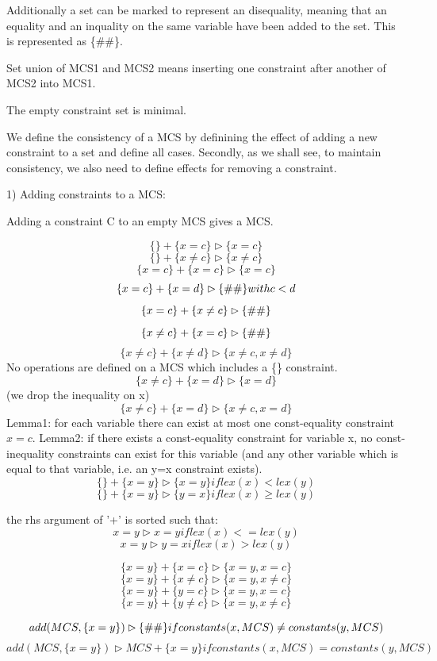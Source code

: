 Additionally a set can be marked to represent an disequality, meaning that an equality and an inquality on the same variable have been added to the set. This is represented as \{\#\#\}.

Set union of MCS1 and MCS2 means inserting one constraint after another of MCS2 into MCS1.

The empty constraint set is minimal.

We define the consistency of a MCS by definining the effect of adding a new constraint to a set and define all cases.
Secondly, as we shall see, to maintain consistency, we also need to define effects for removing a constraint.


1) Adding constraints to a MCS:

Adding a constraint C to an empty MCS gives a MCS.

\[\{\}+\{x=c\}\rhd \{x=c\}\]
\[\{\}+\{x\neq c\}\rhd \{x\neq c\}\]
\[\{x=c\}+\{x=c\}\rhd \{x=c\}\]
\[\{x=c\}+\{x=d\}\rhd \{\#\#\} with c<d\]
\[\{x=c\}+\{x\neq c\}\rhd \{\#\#\}\]
\[\{x\neq c\}+\{x=c\}\rhd \{\#\#\}\]
\[\{x\neq c\}+\{x\neq d\}\rhd \{x\neq c,x\neq d\}\]
No operations are defined on a MCS which includes a \{\deqop\} constraint.
\[\{x\neq c\}+\{x=d\}\rhd \{x=d\}\] (we drop the inequality on x)
\[\{x\neq c\}+\{x=d\}\rhd \{x\neq c,x=d\}\]
Lemma1: for each variable there can exist at most one const-equality constraint $x=c$.
Lemma2: if there exists a const-equality constraint for variable x, no const-inequality constraints can exist for this variable (and any other variable which is equal to that variable, i.e. an y=x constraint exists).
\[\{\}+\{x=y\}\rhd \{x=y\} if lex(x)<lex(y)\]
\[\{\}+\{x=y\}\rhd \{y=x\} if lex(x)\geq lex(y)\]

the rhs argument of '+' is sorted such that:
\[x=y \rhd  x=y if lex(x)<=lex(y)\]
\[x=y \rhd  y=x if lex(x)>lex(y)\]

\[\{x=y\}+\{x=c\}\rhd \{x=y,x=c\}\]
\[\{x=y\}+\{x\neq c\}\rhd \{x=y,x\neq c\}\]
\[\{x=y\}+\{y=c\}\rhd \{x=y,x=c\}\]
\[\{x=y\}+\{y\neq c\}\rhd \{x=y,x\neq c\}\]

\[add(MCS,\{x=y\})\rhd \{\#\#\} if constants(x,MCS)\neq constants(y,MCS)\]
\[add(MCS,\{x=y\})\rhd MCS+\{x=y\} if constants(x,MCS)=constants(y,MCS)\]


